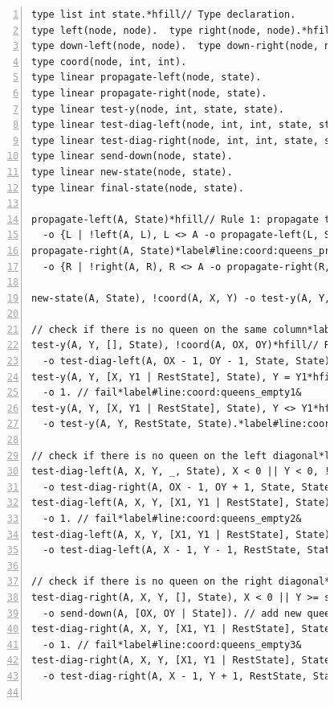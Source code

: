 \begin{figure}[h!]
\begin{Verbatim}[numbers=left,fontsize=\scriptsize,commandchars=\*\#\&]
type list int state.*hfill// Type declaration.
type left(node, node).  type right(node, node).*hfill// Predicate declaration.
type down-left(node, node).  type down-right(node, node).
type coord(node, int, int).
type linear propagate-left(node, state).
type linear propagate-right(node, state).
type linear test-y(node, int, state, state).
type linear test-diag-left(node, int, int, state, state).
type linear test-diag-right(node, int, int, state, state).
type linear send-down(node, state).
type linear new-state(node, state).
type linear final-state(node, state).

propagate-left(A, State)*hfill// Rule 1: propagate to the left.
  -o {L | !left(A, L), L <> A -o propagate-left(L, State)}, new-state(A, State).
propagate-right(A, State)*label#line:coord:queens_propr1&*hfill// Rule 2: propagate to the right.
  -o {R | !right(A, R), R <> A -o propagate-right(R, State)}, new-state(A, State).*label#line:coord:queens_propr2&

new-state(A, State), !coord(A, X, Y) -o test-y(A, Y, State, State).*hfill// Rule 3: check if queen can be added.

// check if there is no queen on the same column*label#line:coord:queens_col1&
test-y(A, Y, [], State), !coord(A, OX, OY)*hfill// Rule 4: check vertical.
  -o test-diag-left(A, OX - 1, OY - 1, State, State).
test-y(A, Y, [X, Y1 | RestState], State), Y = Y1*hfill// Rule 5: check vertical.
  -o 1. // fail*label#line:coord:queens_empty1&
test-y(A, Y, [X, Y1 | RestState], State), Y <> Y1*hfill// Rule 6: check vertical.
  -o test-y(A, Y, RestState, State).*label#line:coord:queens_col2&

// check if there is no queen on the left diagonal*label#line:coord:queens_ldiag1&
test-diag-left(A, X, Y, _, State), X < 0 || Y < 0, !coord(A, OX, OY)*hfill// Rule 7: check left diagonal.
  -o test-diag-right(A, OX - 1, OY + 1, State, State).
test-diag-left(A, X, Y, [X1, Y1 | RestState], State), X = X1, Y = Y1*hfill// Rule 8: check left diagonal.
  -o 1. // fail*label#line:coord:queens_empty2&
test-diag-left(A, X, Y, [X1, Y1 | RestState], State), X <> X1 || Y <> Y1
  -o test-diag-left(A, X - 1, Y - 1, RestState, State).*label#line:coord:queens_ldiag2&*hfill// Rule 9: check left diagonal.

// check if there is no queen on the right diagonal*label#line:coord:queens_rdiag1&
test-diag-right(A, X, Y, [], State), X < 0 || Y >= size, !coord(A, OX, OY)*hfill// Rule 10: check right diagonal.
  -o send-down(A, [OX, OY | State]). // add new queen*label#line:coord:queens_add&
test-diag-right(A, X, Y, [X1, Y1 | RestState], State), X = X1, Y = Y1*hfill// Rule 11: check right diagonal.
  -o 1. // fail*label#line:coord:queens_empty3&
test-diag-right(A, X, Y, [X1, Y1 | RestState], State), X <> X1 || Y <> Y1*hfill// Rule 12: check right diagonal.
  -o test-diag-right(A, X - 1, Y + 1, RestState, State).*label#line:coord:queens_rdiag2&


\end{Verbatim}
\end{figure}
